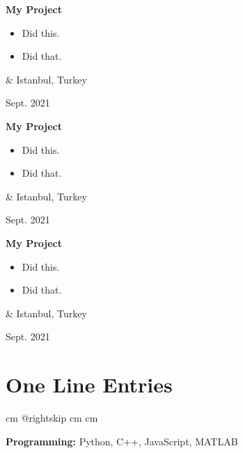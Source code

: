 \documentclass[10pt, letterpaper]{article}
\newenvironment{highlights}{
        \begin{itemize}[
                topsep=0pt,
                parsep=0.10 cm,
                partopsep=0pt,
                itemsep=0pt,
                after=\relax,
                leftmargin=0.4 cm + 3pt
            ]
    }{
        \end{itemize}
    } %
\let\originalTabularx\tabularx
\let\originalEndTabularx\endtabularx
\renewenvironment{tabularx}{\bgroup\centering\originalTabularx}{\originalEndTabularx\par\egroup}
\begin{document}
        \vspace{0.2 cm}
        \begin{tabularx}{
            \textwidth-0.4 cm-0.13cm
        }{
            K{0.2 cm}
            R{4.1 cm}
        }
            \textbf{My Project}

            \vspace{0.10 cm}

            \begin{highlights}
                \item Did this.
                \item Did that.
            \end{highlights}
            &
            Istanbul, Turkey

            Sept. 2021
        \end{tabularx}


        \vspace{0.2 cm}
        \begin{tabularx}{
            \textwidth-0.4 cm-0.13cm
        }{
            K{0.2 cm}
            R{4.1 cm}
        }
            \textbf{My Project}

            \vspace{0.10 cm}

            \begin{highlights}
                \item Did this.
                \item Did that.
            \end{highlights}
            &
            Istanbul, Turkey

            Sept. 2021
        \end{tabularx}


        \vspace{0.2 cm}
        \begin{tabularx}{
            \textwidth-0.4 cm-0.13cm
        }{
            K{0.2 cm}
            R{4.1 cm}
        }
            \textbf{My Project}

            \vspace{0.10 cm}

            \begin{highlights}
                \item Did this.
                \item Did that.
            \end{highlights}
            &
            Istanbul, Turkey

            Sept. 2021
        \end{tabularx}



    
    \section{One Line Entries}

        \begingroup{} cm
        \advance\csname @rightskip cm
        \advance{} cm

        \textbf{Programming:} Python, C++, JavaScript, MATLAB
        \par\endgroup


    
\end{document}
